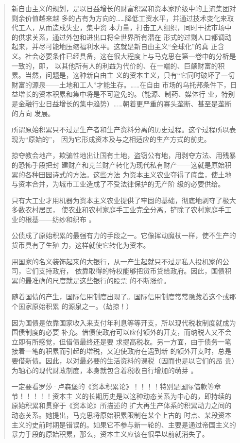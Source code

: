 \begin{quotation}
新自由主义的规划，是以日益增长的财富积累和资本家阶级中的上流集团对剩余价值越来越
多的占有为方向的……降低工资水平，并通过技术变化来取代工人，从而造成失业，集中资
本力量，打击工人组织，同时干扰市场中的供求关系，通过外包和进出口将全世界所有潜在
形式的过剩人口都调动起来，并尽可能地压缩福利水平。这就是新自由主义“全球化”的真
正含义。社会必要条件已经具备，这在很大程度上与马克思在第一卷中的分析是一致的，即，
以其他所有人的利益为代价的、在一端的、巨额财富的积累。当然，问题是，这种新自由主
义的资本主义，只有“它同时破坏了一切财富的源泉——土地和工人”才能生存。……在自由
市场的乌托邦条件下，日益增长的资本积累和集中将是不可避免的。（能源、制药、媒体行
业，特别是金融行业日益增长的集中趋势）……朝着更严重的寡头垄断、甚至是垄断的方向
发展。




所谓原始积累只不过是生产者和生产资料分离的历史过程。这个过程所以表现为“原始的”，
因为它形成资本及与之相适应的生产方式的前史。

掠夺教会地产，欺骗性地出让国有土地，盗窃公有地，用剥夺方法、用残暴的恐怖手段把封
建财产和克兰财产转化为现代私有财产——这就是原始积累的各种田园诗式的方法。这些方法
为资本主义农业夺得了底盘，使土地与资本合并，为城市工业造成了不受法律保护的无产阶
级的必要供给。

只有大工业才用机器为资本主义农业提供了牢固的基础，彻底地剥夺了极大多数农村居民，
使农业和农村家庭手工业完全分离，铲除了农村家庭手工业的根基——纺纱和织布
。

公债成了原始积累的最强有力的手段之一。它像挥动魔杖一样，使不生产的货币具有了生殖
力，这样就使它转化为资本。

用国家的名义装饰起来的大银行，从一产生起就只不过是私人投机家的公司，它们支持政府，
依靠取得的特权能够把货币贷给政府。因此，国债积累的最准确的尺度就是这些银行的股票
的不断涨价。

随着国债的产生，国际信用制度出现了。国际信用制度常常隐藏着这个或那个国家原始积累
的源泉之一。（劫掠！）

因为国债是依靠国家收入来支付年利息等等开支，所以现代税收制度就成为国债制度的必要
补充。借债使政府可以应付额外的开支，而纳税人又不会立即有所感觉，但借债最终还是要
求提高税收。另一方面，由于债务一笔接着一笔的积累而引起的增税，又迫使政府在遇到新
的额外开支时，总是要借新债。因此，以对最必要的生活资料的课税（因而也是以它们的昂
贵）为轴心的现代财政制度，本身就包含着税收自行增加的萌芽
。

一定要看罗莎·卢森堡的《资本积累论》！！！！特别是国际借款等章节！！！！！资本主
义的长期历史是以这种动态关系为中心的，即持续的原始积累和贯穿于《资本论》所描述的
扩大再生产体系的积累动力之间的动态关系。她提出，马克思将原始积累限制在某个上古的
时点、某段资本主义的史前时期是错误的。如果它不参与新一轮的、主要是通过帝国主义的
暴力手段的原始积累，那么，资本主义应该在很早以前就消失了。


\end{quotation}

